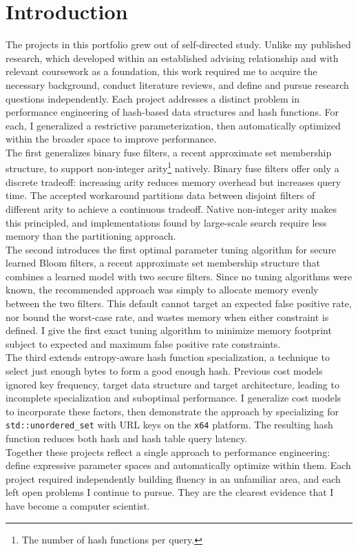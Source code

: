 \section{Introduction}

The projects in this portfolio grew out of self-directed study. Unlike my published research, which developed within an established advising relationship and 
with relevant coursework as a foundation, this work required me to acquire the necessary background, conduct literature reviews, and define and pursue 
research questions independently. Each project addresses a distinct problem in performance engineering of hash-based data structures and hash functions. For 
each, I generalized a restrictive parameterization, then automatically optimized within the broader space to improve performance. \\

\noindent
The first generalizes binary fuse filters, a recent approximate set membership structure, to support non-integer arity\footnote{The number of hash functions per
query.} natively. Binary fuse filters offer only a discrete tradeoff: increasing arity reduces memory overhead but increases query time. The accepted workaround
partitions data between disjoint filters of different arity to achieve a continuous tradeoff. Native non-integer arity makes this principled, and 
implementations found by large-scale search require less memory than the partitioning approach. \\

\noindent
The second introduces the first optimal parameter tuning algorithm for secure learned Bloom filters, a recent approximate set membership structure that combines
a learned model with two secure filters. Since no tuning algorithms were known, the recommended approach was simply to allocate memory evenly between the
two filters. This default cannot target an expected false positive rate, nor bound the worst-case rate, and wastes memory when either constraint is defined. I 
give the first exact tuning algorithm to minimize memory footprint subject to expected and maximum false positive rate constraints. \\

\noindent
The third extends entropy-aware hash function specialization, a technique to select just enough bytes to form a good enough hash. Previous cost models ignored 
key frequency, target data structure and target architecture, leading to incomplete specialization and suboptimal performance. I generalize cost models to 
incorporate these factors, then demonstrate the approach by specializing for \texttt{std::unordered\_set} with URL keys on the \texttt{x64} platform. The 
resulting hash function reduces both hash and hash table query latency. \\

\noindent
Together these projects reflect a single approach to performance engineering: define expressive parameter spaces and automatically optimize within them. Each 
project required independently building fluency in an unfamiliar area, and each left open problems I continue to pursue. They are the clearest evidence that I 
have become a computer scientist.